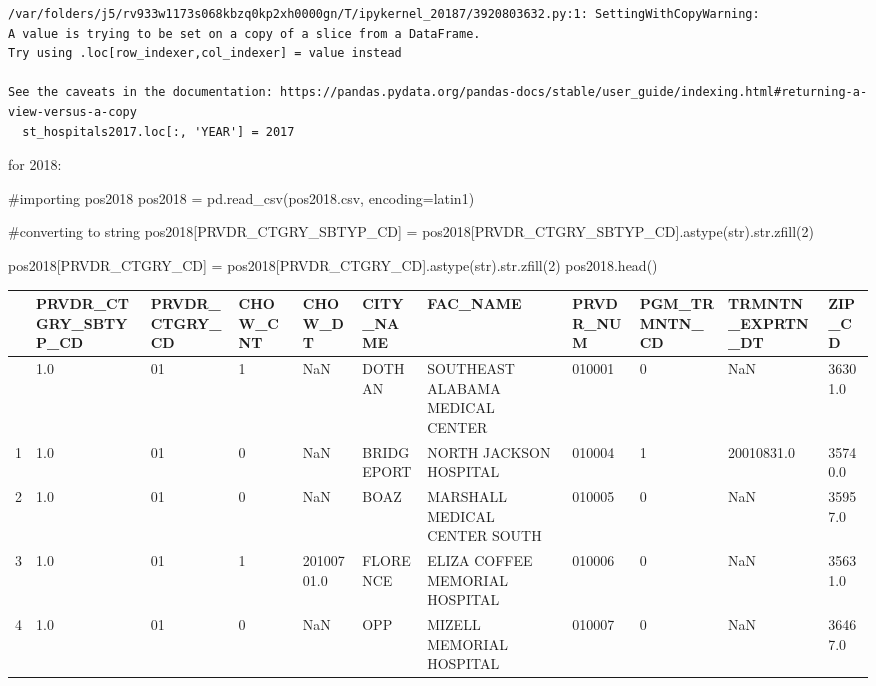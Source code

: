 \documentclass[
  letterpaper,
  DIV=11,
  numbers=noendperiod]{scrartcl}
\newenvironment{Shaded}{\begin{snugshade}}{\end{snugshade}}
\newcommand{\BuiltInTok}[1]{\textcolor[rgb]{0.00,0.23,0.31}{#1}}
\newcommand{\CommentTok}[1]{\textcolor[rgb]{0.37,0.37,0.37}{#1}}
\newcommand{\DecValTok}[1]{\textcolor[rgb]{0.68,0.00,0.00}{#1}}
\newcommand{\NormalTok}[1]{\textcolor[rgb]{0.00,0.23,0.31}{#1}}
\newcommand{\OperatorTok}[1]{\textcolor[rgb]{0.37,0.37,0.37}{#1}}
\newcommand{\StringTok}[1]{\textcolor[rgb]{0.13,0.47,0.30}{#1}}
\begin{document}
\begin{verbatim}
/var/folders/j5/rv933w1173s068kbzq0kp2xh0000gn/T/ipykernel_20187/3920803632.py:1: SettingWithCopyWarning: 
A value is trying to be set on a copy of a slice from a DataFrame.
Try using .loc[row_indexer,col_indexer] = value instead

See the caveats in the documentation: https://pandas.pydata.org/pandas-docs/stable/user_guide/indexing.html#returning-a-view-versus-a-copy
  st_hospitals2017.loc[:, 'YEAR'] = 2017
\end{verbatim}

for 2018:

\begin{Shaded}
\begin{Highlighting}[]
\CommentTok{\#importing pos2018}
\NormalTok{pos2018 }\OperatorTok{=}\NormalTok{ pd.read\_csv(}\StringTok{\textquotesingle{}pos2018.csv\textquotesingle{}}\NormalTok{, encoding}\OperatorTok{=}\StringTok{\textquotesingle{}latin1\textquotesingle{}}\NormalTok{)}
\end{Highlighting}
\end{Shaded}

\begin{Shaded}
\begin{Highlighting}[]
\CommentTok{\#converting to string}
\NormalTok{pos2018[}\StringTok{\textquotesingle{}PRVDR\_CTGRY\_SBTYP\_CD\textquotesingle{}}\NormalTok{] }\OperatorTok{=}\NormalTok{ pos2018[}\StringTok{\textquotesingle{}PRVDR\_CTGRY\_SBTYP\_CD\textquotesingle{}}\NormalTok{].astype(}\BuiltInTok{str}\NormalTok{).}\BuiltInTok{str}\NormalTok{.zfill(}\DecValTok{2}\NormalTok{)}

\NormalTok{pos2018[}\StringTok{\textquotesingle{}PRVDR\_CTGRY\_CD\textquotesingle{}}\NormalTok{] }\OperatorTok{=}\NormalTok{ pos2018[}\StringTok{\textquotesingle{}PRVDR\_CTGRY\_CD\textquotesingle{}}\NormalTok{].astype(}\BuiltInTok{str}\NormalTok{).}\BuiltInTok{str}\NormalTok{.zfill(}\DecValTok{2}\NormalTok{)}
\NormalTok{pos2018.head()}
\end{Highlighting}
\end{Shaded}

\begin{longtable}[]{@{}lllllllllll@{}}
\toprule\noalign{}
& PRVDR\_CTGRY\_SBTYP\_CD & PRVDR\_CTGRY\_CD & CHOW\_CNT & CHOW\_DT &
CITY\_NAME & FAC\_NAME & PRVDR\_NUM & PGM\_TRMNTN\_CD &
TRMNTN\_EXPRTN\_DT & ZIP\_CD \\
\midrule\noalign{}
\endhead
\bottomrule\noalign{}
\endlastfoot
0 & 1.0 & 01 & 1 & NaN & DOTHAN & SOUTHEAST ALABAMA MEDICAL CENTER &
010001 & 0 & NaN & 36301.0 \\
1 & 1.0 & 01 & 0 & NaN & BRIDGEPORT & NORTH JACKSON HOSPITAL & 010004 &
1 & 20010831.0 & 35740.0 \\
2 & 1.0 & 01 & 0 & NaN & BOAZ & MARSHALL MEDICAL CENTER SOUTH & 010005 &
0 & NaN & 35957.0 \\
3 & 1.0 & 01 & 1 & 20100701.0 & FLORENCE & ELIZA COFFEE MEMORIAL
HOSPITAL & 010006 & 0 & NaN & 35631.0 \\
4 & 1.0 & 01 & 0 & NaN & OPP & MIZELL MEMORIAL HOSPITAL & 010007 & 0 &
NaN & 36467.0 \\
\end{longtable}
\end{document}
